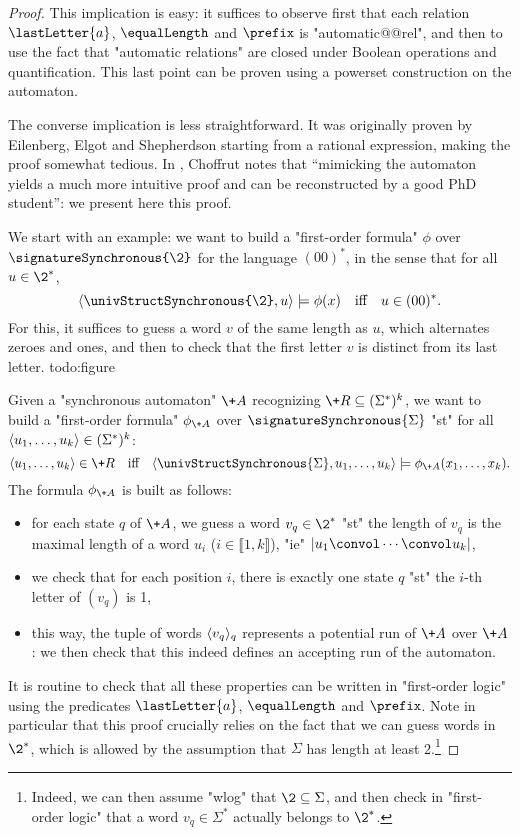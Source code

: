 \begin{proof}
	This implication is easy: it suffices to observe first that each
	relation $\lastLetter{a}$, $\equalLength$ and $\prefix$ is "automatic@@rel",
	and then to use the fact that "automatic relations" are closed under
	Boolean operations and quantification. This last point can be proven
	using a powerset construction on the automaton.

	The converse implication is less straightforward. It was originally proven by
	Eilenberg, Elgot and Shepherdson starting from a rational expression, making
	the proof somewhat tedious.
	In \cite[\S~``1969'']{Choffrut2006Survey}, Choffrut notes that
	``mimicking the automaton yields a much
	more intuitive proof and can be reconstructed by a good PhD student'':
	we present here this proof.
	
	We start with an example: we want to build a "first-order formula" $\phi$ over $\signatureSynchronous{\2}$ for the language $(00)^*$, in the sense
	that for all $u\in \2^*$,
	\[
		\tup{\univStructSynchronous{\2}, u} \models \phi(x) \quad\text{iff}\quad u \in (00)^*.
	\]
	For this, it suffices to guess a word $v$ of the same length as $u$, which alternates
	zeroes and ones, and then to check that the first letter $v$ is distinct from
	its last letter.
	todo:figure

	Given a "synchronous automaton" $\+A$ recognizing $\+R \subseteq (\Sigma^*)^k$,
	we want to build a "first-order formula" $\phi_{\+A}$ over $\signatureSynchronous{\Sigma}$
	"st" for all $\langle u_1,\hdots, u_k\rangle \in (\Sigma^*)^k$:
	\[
		\tup{u_1,\hdots, u_k} \in \+R
		\quad\text{iff}\quad
		\tup{\univStructSynchronous{\Sigma}, u_1,\hdots, u_k} \models \phi_{\+A}(x_1,\hdots,x_k).
	\]
	The formula $\phi_{\+A}$ is built as follows:
	\begin{itemize}
		\item for each state $q$ of $\+A$, we guess a word $v_q \in \2^*$ "st"
			the length of $v_q$ is the maximal length of a word $u_i$ ($i \in \lBrack 1,k\rBrack$),
			"ie" $|u_1 \convol \cdots \convol u_k|$,
		\item we check that for each position $i$, there is exactly one state $q$
			"st" the $i$-th letter of $(v_q)$ is 1,
		\item this way, the tuple of words $\langle v_q\rangle_{q}$ represents a potential run of $\+A$
			over $\+A$: we then check that this indeed defines an accepting run of the automaton. 
	\end{itemize}
	It is routine to check that all these properties can be written in "first-order logic"
	using the predicates $\lastLetter{a}$, $\equalLength$ and $\prefix$.
	Note in particular that this proof crucially relies on the fact that we can guess words
	in $\2^*$, which is allowed by the assumption that $\Sigma$ has length at least 2.\footnote{Indeed, we can then assume "wlog" that $\2 \subseteq \Sigma$, and then
	check in "first-order logic" that a word $v_q \in \Sigma^*$ actually
	belongs to $\2^*$.}
\end{proof}

